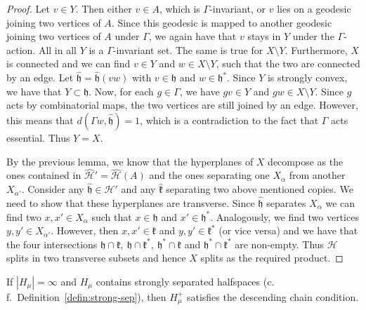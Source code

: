 \begin{proof}
  Let \(v \in Y\). Then either \(v \in A\), which is \(\Gamma\)-invariant, or \(v\) lies on a geodesic joining two vertices of \(A\). Since this geodesic is mapped to another geodesic joining two vertices of \(A\) under \(\Gamma\), we again have that \(v\) stays in \(Y\) under the \(\Gamma\)-action. All in all \(Y\) is a \(\Gamma\)-invariant set. The same is true for \(X \setminus Y\). Furthermore, \(X\) is connected and we can find \(v \in Y\) and \(w \in X \setminus Y\), such that the two are connected by an edge. Let \(\mathfrak{\hat h} = \mathfrak{\hat h}(vw)\) with \(v \in \mathfrak{h}\) and \(w \in \mathfrak{h}^\ast\). Since \(Y\) is strongly convex, we have that \(Y \subset \mathfrak{h}\). Now, for each \(g \in \Gamma\), we have \(gv \in Y\) and \(gw \in X \setminus Y\). Since \(g\) acts by combinatorial maps, the two vertices are still joined by an edge. However, this means that \(d(\Gamma w, \mathfrak{\hat h}) = 1\), which is a contradiction to the fact that \(\Gamma\) acts essential. Thus \(Y = X\).

  By the previous lemma, we know that the hyperplanes of \(X\) decompose as the ones contained in \(\mathcal{\hat H'} = \mathcal{\hat H}(A)\) and the ones separating one \(X_\alpha\) from another \(X_{\alpha'}\). Consider any \(\mathfrak{\hat h} \in \mathcal{\hat H'}\) and any \(\mathfrak{\hat k}\) separating two above mentioned copies. We need to show that these hyperplanes are transverse. Since \(\mathfrak{\hat h}\) separates \(X_\alpha\) we can find two \(x, x' \in X_\alpha\) such that \(x \in \mathfrak{h}\) and \(x' \in \mathfrak{h}^\ast\). Analogously, we find two vertices \(y,y' \in X_{\alpha'}\). However, then \(x,x' \in \mathfrak{k}\) and \(y,y' \in \mathfrak{k}^\ast\) (or vice versa) and we have that the four intersections \(\mathfrak{h} \cap \mathfrak{k},\ \mathfrak{h} \cap \mathfrak{k}^\ast,\ \mathfrak{h}^\ast \cap \mathfrak{k}\) and \(\mathfrak{h}^\ast \cap \mathfrak{k}^\ast\) are non-empty. Thus \(\mathcal{H}\) splits in two transverse subsets and hence \(X\) splits as the required product.
\end{proof}

\begin{lemma}[{\cite[Lemma~4.18]{MR3509968}}]
  \label{lem:4.18}
  If \(|H_\mu| = \infty\) and \(H_\mu\) contains strongly separated halfspaces (c.\,f.~Definition~\ref{defin:strong-sep}), then \(H_\mu^+\) satisfies the descending chain condition.
\end{lemma}

